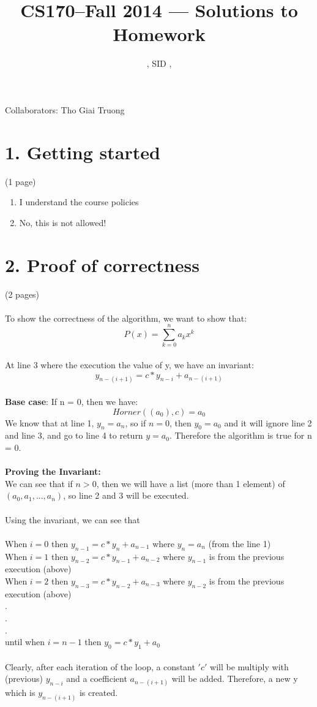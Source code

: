 \documentclass[11pt]{article}
\title{CS170--Fall 2014 --- Solutions to Homework \Homework}
\author{\Name, SID \SID, \texttt{\Login}}
\newenvironment{qparts}{\begin{enumerate}[{(}a{)}]}{\end{enumerate}}
\begin{document}
\maketitle

Collaborators: Tho Giai Truong

\section*{1. Getting started} (1 page)

\begin{qparts}
\item
I understand the course policies

\item
No, this is not allowed!

\end{qparts}

\newpage
\section*{2. Proof of correctness} (2 pages)\\\\
To show the correctness of the algorithm, we want to show that: 
$$P(x) = \sum_{k=0}^{n} {a_k}{x^k}$$\\
At line 3 where the execution the value of y, we have an invariant:\\
\Large{$$ y_{n - (i + 1)} = c*y_{n - i} + a_{n - (i + 1)}$$}\\
\Large{\textbf{Base case}}: If n = 0, then we have:
$$Horner((a_0),c) = a_0$$
We know that at line 1, $y_n = a_n$, so if $n = 0$, then $y_0 = a_0$ and it will ignore line 2 and line 3, and go to line 4 to return $y = a_0$. Therefore the algorithm is true for n = 0.\\\\
\Large{\textbf{Proving the Invariant:}}\\
We can see that if $n > 0$, then we will have a list (more than 1 element) of $(a_0, a_1, ..., a_n)$, so line 2 and 3 will be executed.\\\\
Using the invariant, we can see that\\\\
When $i = 0$ then $y_{n - 1} = c*y_n + a_{n - 1}$ where $y_n = a_n$ (from the line 1)\\
When $i = 1$ then $ y_{n - 2} = c*y_{n - 1} + a_{n - 2}$ where $y_{n - 1}$ is from the previous execution (above)\\
When $i = 2$ then $ y_{n - 3} = c*y_{n - 2} + a_{n - 3}$ where $y_{n - 2}$ is from the previous execution (above)\\
.\\
.\\
.\\
until when $i = n-1$ then $ y_{0} = c*y_{1} + a_{0}$\\\\
Clearly, after each iteration of the loop, a constant $'c'$ will be multiply with (previous) $y_{n - i}$ and a coefficient $a_{n - (i + 1)}$ will be added. Therefore, a new y which is $y_{n - (i + 1)}$ is created. 
\end{document}
